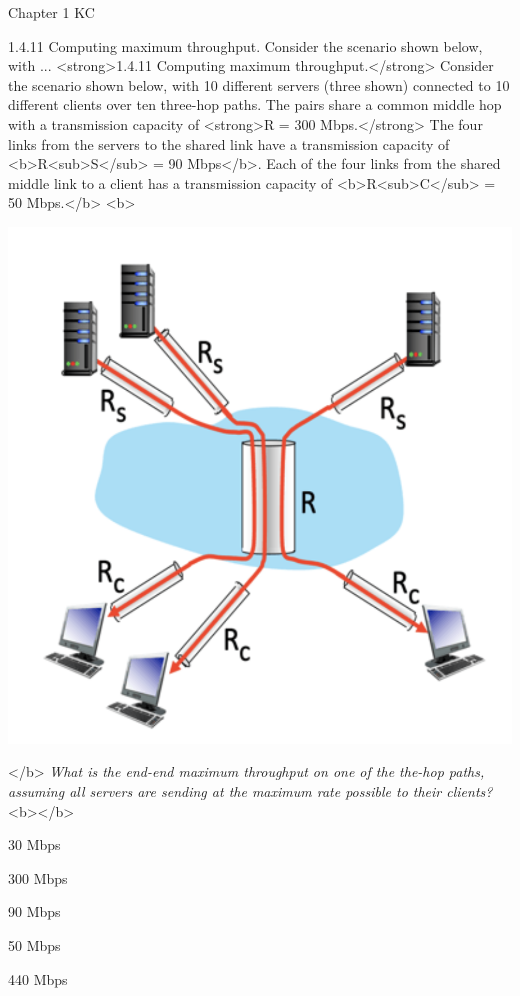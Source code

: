 \documentclass[a4paper]{article}
\begin{document}
\begin{quiz}{Chapter 1 KC}
\begin{multi}[points=1]{1.4.11 Computing maximum throughput. Consider the scenario shown below, with ...}
<strong>1.4.11 Computing maximum throughput.</strong> Consider the scenario shown below, with 10 different servers (three shown) connected to 10 different clients over ten three-hop paths. The pairs share a common middle hop with a transmission capacity of <strong>R = 300 Mbps.</strong> The four links from the servers to the shared link have a transmission capacity of <b>R<sub>S</sub> = 90 Mbps</b>. Each of the four links from the shared middle link to a client has a transmission capacity of <b>R<sub>C</sub> = 50 Mbps.</b> <b>
\begin{center}
\includegraphics[width=\linewidth]{figs/1.4.11.png}
\end{center}
</b> \emph{What is the end-end maximum throughput on one of the the-hop paths, assuming all servers are sending at the maximum rate possible to their clients?}<b></b>  
\item* 30 Mbps
\item 300 Mbps
\item 90 Mbps
\item 50 Mbps
\item 440 Mbps
\end{multi}


\end{quiz}
\end{document}
